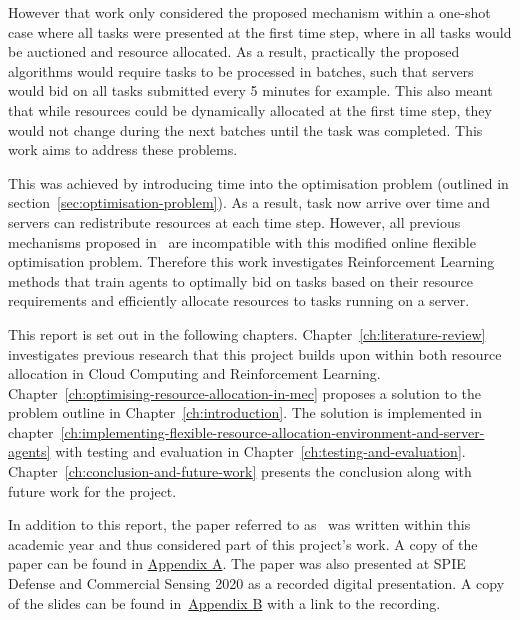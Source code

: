 However that work only considered the proposed mechanism within a one-shot case where all tasks were presented
at the first time step, where in all tasks would be auctioned and resource allocated. As a result, practically the proposed
algorithms would require tasks to be processed in batches, such that servers would bid on all tasks submitted every 5
minutes for example. This also meant that while resources could be dynamically allocated at the first time step, they
would not change during the next batches until the task was completed. This work aims to address these problems.

This was achieved by introducing time into the optimisation problem (outlined in section~\ref{sec:optimisation-problem}).
As a result, task now arrive over time and servers can redistribute resources at each time step. However, all
previous mechanisms proposed in~\cite{FlexibleResourceAllocation} are incompatible with this modified online flexible
optimisation problem. Therefore this work investigates Reinforcement Learning methods that train agents to optimally
bid on tasks based on their resource requirements and efficiently allocate resources to tasks running on a server.

This report is set out in the following chapters. Chapter~\ref{ch:literature-review} investigates previous research
that this project builds upon within both resource allocation in Cloud Computing and Reinforcement Learning.
Chapter~\ref{ch:optimising-resource-allocation-in-mec} proposes a solution to the problem outline in
Chapter~\ref{ch:introduction}.
The solution is implemented in chapter~\ref{ch:implementing-flexible-resource-allocation-environment-and-server-agents}
with testing and evaluation in Chapter~\ref{ch:testing-and-evaluation}. Chapter~\ref{ch:conclusion-and-future-work}
presents the conclusion along with future work for the project.

In addition to this report, the paper referred to as~\cite{FlexibleResourceAllocation} was written within this
academic year and thus considered part of this project's work. A copy of the paper can be found in
\hyperref[app:paper]{Appendix A}. The paper was also presented at SPIE Defense and Commercial
Sensing 2020 as a recorded digital presentation. A copy of the slides can be found
in~\hyperref[app:spie-presentation]{Appendix B} with a link to the recording.
